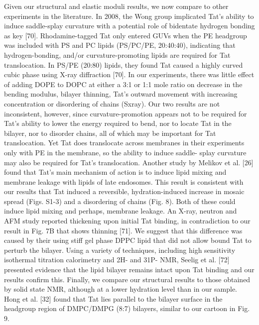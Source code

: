 Given our structural and elastic moduli results, we now compare to other 
experiments in
the literature. In 2008, the Wong group implicated Tat’s ability to induce saddle-splay curvature
with a potential role of bidentate hydrogen bonding as key [70]. Rhodamine-tagged Tat only
entered GUVs when the PE headgroup was included with PS and PC lipids (PS/PC/PE,
20:40:40), indicating that hydrogen-bonding, and/or curvature-promoting lipids are required for
Tat translocation. In PS/PE (20:80) lipids, they found Tat caused a highly curved cubic phase
using X-ray diffraction [70]. In our experiments, there was little effect of adding DOPE to
DOPC at either a 3:1 or 1:1 mole ratio on decrease in the bending modulus, bilayer thinning,
Tat’s outward movement with increasing concentration or disordering of chains (Sxray). Our two
results are not inconsistent, however, since curvature-promotion appears not to be required for
Tat’s ability to lower the energy required to bend, nor to locate Tat in the bilayer, nor to disorder
chains, all of which may be important for Tat translocation. Yet Tat does translocate across
membranes in their experiments only with PE in the membrane, so the ability to induce saddle-
splay curvature may also be required for Tat’s translocation. Another study by Melikov et al.
[26] found that Tat’s main mechanism of action is to induce lipid mixing and membrane leakage
with lipids of late endosomes. This result is consistent with our results that Tat induced a
reversible, hydration-induced increase in mosaic spread (Figs. S1-3) and a disordering of chains
(Fig. 8). Both of these could induce lipid mixing and perhaps, membrane leakage. An X-ray,
neutron and AFM study reported thickening upon initial Tat binding, in contradiction to our
result in Fig. 7B that shows thinning [71]. We suggest that this difference was caused by their
using stiff gel phase DPPC lipid that did not allow bound Tat to perturb the bilayer. Using a
variety of techniques, including high sensitivity isothermal titration calorimetry and 2H- and 31P-
NMR, Seelig et al. [72] presented evidence that the lipid bilayer remains intact upon Tat binding
and our results confirm this. Finally, we compare our structural results to those obtained by solid
state NMR, although at a lower hydration level than in our sample. Hong et al. [32] found that
Tat lies parallel to the bilayer surface in the headgroup region of DMPC/DMPG (8:7) bilayers,
similar to our cartoon in Fig. 9.

